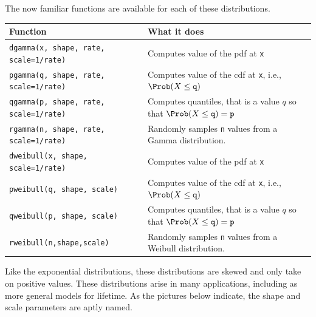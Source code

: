 \documentclass[twoside]{book}\usepackage[]{graphicx}\usepackage[]{xcolor}
\begin{document}
The now familiar functions are available for each of these distributions.
\begin{center}
\begin{tabular}{ll}
	\hline
	Function & What it does \\
	\hline
	\texttt{dgamma(x, shape, rate, scale=1/rate)} & Computes value of the pdf at \texttt{x}
	\\
	\texttt{pgamma(q, shape, rate, scale=1/rate)} 
		& Computes value of the cdf at \texttt{x}, i.e., 
	$\Prob(X \le \texttt{q})$
	\\
	\texttt{qgamma(p, shape, rate, scale=1/rate)} 
		& Computes quantiles, that is a value $q$ so that 
	$\Prob(X \le \texttt{q}) = \texttt{p}$
    \\
	\texttt{rgamma(n, shape, rate, scale=1/rate)} & Randomly samples \texttt{n} values from a
	Gamma distribution.
	\\
	\hline
	\texttt{dweibull(x, shape, scale=1/rate)} & Computes value of the pdf at \texttt{x}
	\\
	\texttt{pweibull(q, shape, scale)} 
		& Computes value of the cdf at \texttt{x}, i.e., 
	$\Prob(X \le \texttt{q})$
	\\
	\texttt{qweibull(p, shape, scale)} 
		& Computes quantiles, that is a value $q$ so that 
	$\Prob(X \le \texttt{q}) = \texttt{p}$
    \\
	\texttt{rweibull(n,shape,scale)} & Randomly samples \texttt{n} values from a
	Weibull distribution.
	\\
	\hline
\end{tabular}
\end{center}

Like the exponential distributions, these distributions are skewed and only take 
on positive values.  
These distributions arise in many applications, including as more general models 
for lifetime.  As the pictures below indicate, the shape and scale parameters
are aptly named.
\end{document}
